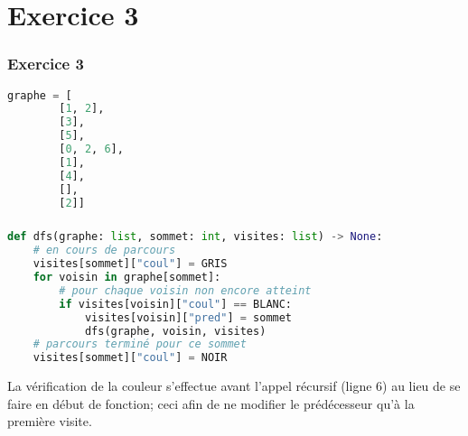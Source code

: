 \documentclass[svgnames,11pt]{beamer}
\begin{document}
\section{Exercice 3}
\begin{frame}[fragile]
    \frametitle{Exercice 3}

\begin{center}
\begin{lstlisting}[language=Python , basicstyle=\ttfamily\small, xleftmargin=2em, xrightmargin=2em]
graphe = [
        [1, 2],
        [3],
        [5],
        [0, 2, 6],
        [1],
        [4],
        [],
        [2]]
\end{lstlisting}
\end{center}

\end{frame}
\begin{frame}[fragile]
    \frametitle{}

\begin{center}
\begin{lstlisting}[language=Python , basicstyle=\ttfamily\small, xleftmargin=0.2em, xrightmargin=-3em]
def dfs(graphe: list, sommet: int, visites: list) -> None:
    # en cours de parcours
    visites[sommet]["coul"] = GRIS
    for voisin in graphe[sommet]:
        # pour chaque voisin non encore atteint
        if visites[voisin]["coul"] == BLANC:
            visites[voisin]["pred"] = sommet
            dfs(graphe, voisin, visites)
    # parcours terminé pour ce sommet
    visites[sommet]["coul"] = NOIR
\end{lstlisting}
\end{center}
\begin{aretenir}[Remarque]
La vérification de la couleur s'effectue avant l'appel récursif (ligne 6) au lieu de se faire en début de fonction; ceci afin de ne modifier le prédécesseur qu'à la première visite.
\end{aretenir}
\end{frame}
\end{document}
